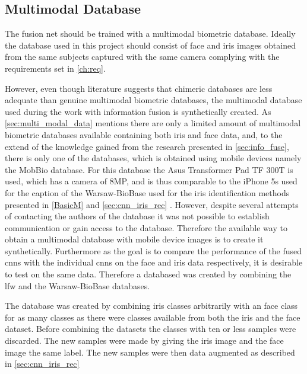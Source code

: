 
\subsection{Multimodal Database}
The fusion net should be trained with a multimodal biometric database. Ideally the database used in this project should consist of face and iris images obtained from the same subjects captured with the same camera complying with the requirements set in \autoref{ch:req}. 

However, even though literature suggests that chimeric databases are less adequate than genuine multimodal biometric databases, the multimodal database used during the work with information fusion is synthetically created. As \autoref{sec:multi_modal_data} mentions there are only a limited amount of multimodal biometric databases available containing both iris and face data, and, to the extend of the knowledge gained from the research presented in \autoref{sec:info_fuse}, there is only one of the databases, which is obtained using mobile devices namely the MobBio database. For this database the Asus Transformer Pad TF 300T is used, which has a camera of 8MP, and is thus comparable to the iPhone 5s used for the caption of the Warsaw-BioBase used for the iris identification methods presented in \autoref{BasicM} and \autoref{sec:cnn_iris_rec} \citep{Sequeira2014}. However, despite several attempts of contacting the authors of the database it was not possible to establish communication or gain access to the database. Therefore the available way to obtain a multimodal database with mobile device images is to create it synthetically. Furthermore as the goal is to compare the performance of the fused \gls{cnn}s with the individual \gls{cnn}s on the face and iris data respectively, it is desirable to test on the same data. Therefore a databased was created by combining the \gls{lfw} and the Warsaw-BioBase databases. 

The database was created by combining iris classes arbitrarily with an face class for as many classes as there were classes available from both the iris and the face dataset. Before combining the datasets the classes with ten or less samples were discarded. The new samples were made by giving the iris image and the face image the same label. The new samples were then data augmented as described in \autoref{sec:cnn_iris_rec}

